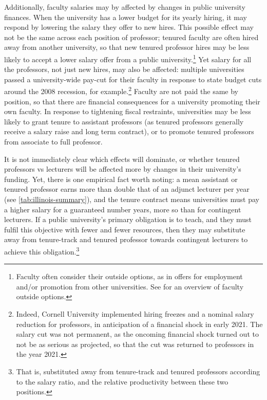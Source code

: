Additionally, faculty salaries may by affected by changes in public university finances.
When the university has a lower budget for its yearly hiring, it may respond by lowering the salary they offer to new hires.
This possible effect may not be the same across each position of professor; tenured faculty are often hired away from another university, so that new tenured professor hires may be less likely to accept a lower salary offer from a public university.\footnote{
    Faculty often consider their outside options, as in offers for employment and/or promotion from other universities.
    See \cite{blackaby2005} for an overview of faculty outside options.
}
Yet salary for all the professors, not just new hires, may also be affected: multiple universities passed a university-wide pay-cut for their faculty in response to state budget cuts around the 2008 recession, for example.\footnote{
    Indeed, Cornell University implemented hiring freezes and a nominal salary reduction for professors, in anticipation of a financial shock in early 2021.
    The salary cut was not permanent, as the oncoming financial shock turned out to not be as serious as projected, so that the cut was returned to professors in the year 2021.
}
Faculty are not paid the same by position, so that there are financial consequences for a university promoting their own faculty.
In response to tightening fiscal restraints, universities may be less likely to grant tenure to assistant professors (as tenured professors generally receive a salary raise and long term contract), or to promote tenured professors from associate to full professor.

It is not immediately clear which effects will dominate, or whether tenured professors vs lecturers will be affected more by changes in their university's funding.
Yet, there is one empirical fact worth noting: a mean assistant or tenured professor earns more than double that of an adjunct lecturer per year (see \autoref{tab:illinois-summary}), and the tenure contract means universities must pay a higher salary for a guaranteed number years, more so than for contingent lecturers.
If a public university's primary obligation is to teach, and they must fulfil this objective with fewer and fewer resources, then they may substitute away from tenure-track and tenured professor towards contingent lecturers to achieve this obligation.\footnote{
    That is, substituted away from tenure-track and tenured professors according to the salary ratio, and the relative productivity between these two positions.
}
